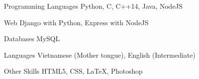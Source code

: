 


\begin{cvskills}


\cvskill
{Programming Languages} %
{Python, C, C++14, Java, NodeJS} %


\cvskill
{Web} %
{Django with Python, Express with NodeJS} %

\cvskill
{Databases} %
{MySQL} %


\cvskill
{Languages} %
{Vietnamese (Mother tongue), English (Intermediate)} %


\cvskill
{Other Skills} %
{HTML5, CSS, LaTeX, Photoshop}%


\end{cvskills}
